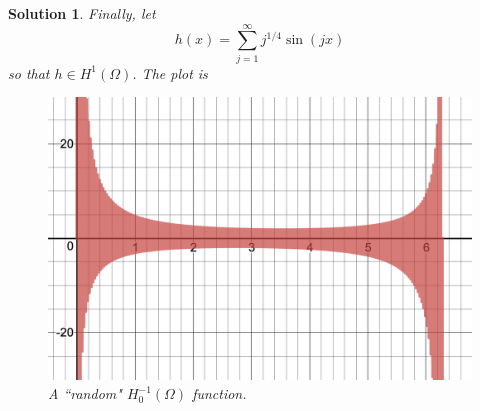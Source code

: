 \documentclass[leqno]{article}
\theoremstyle{nonumberplain}
\newtheorem{solution}{Solution}
\begin{document}
\begin{solution}
Finally, let
\[
h(x) = \sum_{j=1}^\infty j^{1/4} \sin(jx)
\]
so that $h\in H^1(\Omega)$.  The plot is
\begin{figure}[H]
    \centering
    \includegraphics[width=.7\textwidth]{h^-1.png}
    \caption{A ``random" $H^{-1}_0(\Omega)$ function.}
\end{figure}
\end{solution}
\end{document}
